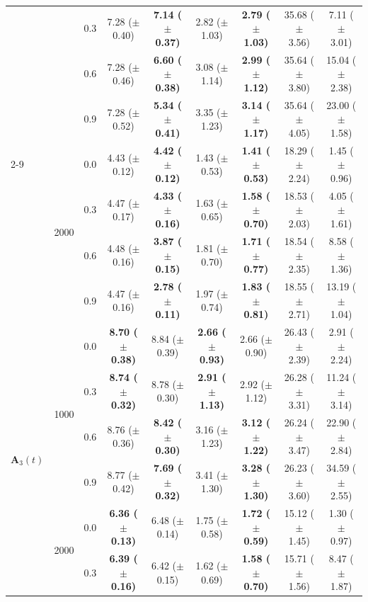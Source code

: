 \begin{table}[htbp]
{\begin{tabular}{lll|cc|cc|cc}
 &  & 0.3 & 7.28 ($\pm$ 0.40) & \textbf{7.14 ($\pm$ 0.37)} & 2.82 ($\pm$ 1.03) & \textbf{2.79 ($\pm$ 1.03)} & 35.68 ($\pm$ 3.56) & 7.11 ($\pm$ 3.01) \\
 &  & 0.6 & 7.28 ($\pm$ 0.46) & \textbf{6.60 ($\pm$ 0.38)} & 3.08 ($\pm$ 1.14) & \textbf{2.99 ($\pm$ 1.12)} & 35.64 ($\pm$ 3.80) & 15.04 ($\pm$ 2.38) \\
 &  & 0.9 & 7.28 ($\pm$ 0.52) & \textbf{5.34 ($\pm$ 0.41)} & 3.35 ($\pm$ 1.23) & \textbf{3.14 ($\pm$ 1.17)} & 35.64 ($\pm$ 4.05) & 23.00 ($\pm$ 1.58) \\
\cline{2-9}
 & \multirow{4}{*}{2000} & 0.0 & 4.43 ($\pm$ 0.12) & \textbf{4.42 ($\pm$ 0.12)} & 1.43 ($\pm$ 0.53) & \textbf{1.41 ($\pm$ 0.53)} & 18.29 ($\pm$ 2.24) & 1.45 ($\pm$ 0.96) \\
 &  & 0.3 & 4.47 ($\pm$ 0.17) & \textbf{4.33 ($\pm$ 0.16)} & 1.63 ($\pm$ 0.65) & \textbf{1.58 ($\pm$ 0.70)} & 18.53 ($\pm$ 2.03) & 4.05 ($\pm$ 1.61) \\
 &  & 0.6 & 4.48 ($\pm$ 0.16) & \textbf{3.87 ($\pm$ 0.15)} & 1.81 ($\pm$ 0.70) & \textbf{1.71 ($\pm$ 0.77)} & 18.54 ($\pm$ 2.35) & 8.58 ($\pm$ 1.36) \\
 &  & 0.9 & 4.47 ($\pm$ 0.16) & \textbf{2.78 ($\pm$ 0.11)} & 1.97 ($\pm$ 0.74) & \textbf{1.83 ($\pm$ 0.81)} & 18.55 ($\pm$ 2.71) & 13.19 ($\pm$ 1.04) \\
\hline
\multirow{8}{*}{$\mathbf{A}_3(t)$} & \multirow{4}{*}{1000} & 0.0 & \textbf{8.70 ($\pm$ 0.38)} & 8.84 ($\pm$ 0.39) & \textbf{2.66 ($\pm$ 0.93)} & 2.66 ($\pm$ 0.90) & 26.43 ($\pm$ 2.39) & 2.91 ($\pm$ 2.24) \\
 &  & 0.3 & \textbf{8.74 ($\pm$ 0.32)} & 8.78 ($\pm$ 0.30) & \textbf{2.91 ($\pm$ 1.13)} & 2.92 ($\pm$ 1.12) & 26.28 ($\pm$ 3.31) & 11.24 ($\pm$ 3.14) \\
 &  & 0.6 & 8.76 ($\pm$ 0.36) & \textbf{8.42 ($\pm$ 0.30)} & 3.16 ($\pm$ 1.23) & \textbf{3.12 ($\pm$ 1.22)} & 26.24 ($\pm$ 3.47) & 22.90 ($\pm$ 2.84) \\
 &  & 0.9 & 8.77 ($\pm$ 0.42) & \textbf{7.69 ($\pm$ 0.32)} & 3.41 ($\pm$ 1.30) & \textbf{3.28 ($\pm$ 1.30)} & 26.23 ($\pm$ 3.60) & 34.59 ($\pm$ 2.55) \\
\cline{2-9}
 & \multirow{4}{*}{2000} & 0.0 & \textbf{6.36 ($\pm$ 0.13)} & 6.48 ($\pm$ 0.14) & 1.75 ($\pm$ 0.58) & \textbf{1.72 ($\pm$ 0.59)} & 15.12 ($\pm$ 1.45) & 1.30 ($\pm$ 0.97) \\
 &  & 0.3 & \textbf{6.39 ($\pm$ 0.16)} & 6.42 ($\pm$ 0.15) & 1.62 ($\pm$ 0.69) & \textbf{1.58 ($\pm$ 0.70)} & 15.71 ($\pm$ 1.56) & 8.47 ($\pm$ 1.87) \\

\end{tabular}}
\end{table}
